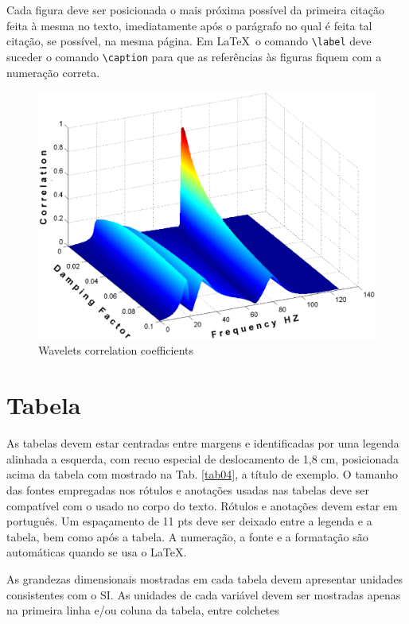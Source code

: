 Cada figura deve ser posicionada o mais próxima possível da primeira citação 
feita à mesma no texto, imediatamente após o parágrafo no qual é feita tal 
citação, se possível, na mesma página. Em \LaTeX\, o comando \texttt{\textbackslash label} deve suceder o comando \texttt{\textbackslash caption} para que as referências às figuras fiquem com a numeração correta.
\begin{figure}[h]
	\centering
	\includegraphics[keepaspectratio=true,scale=0.3]{figuras/fig01.eps}
	\caption{Wavelets correlation coefficients}
	\label{fig05}
\end{figure}

\section{Tabela}

As tabelas devem estar centradas entre margens e identificadas por uma legenda 
alinhada a esquerda, com recuo especial de deslocamento de 1,8 cm, posicionada 
acima da tabela com mostrado na Tab. \ref{tab04}, a título de 
exemplo. O tamanho das fontes empregadas nos rótulos e anotações usadas nas 
tabelas deve ser compatível com o usado no corpo do texto. Rótulos e anotações 
devem estar em português. Um espaçamento de 11 pts deve ser deixado entre a 
legenda e a tabela, bem como após a tabela. A numeração, a fonte e a formatação
são automáticas quando se usa o \LaTeX.

As grandezas dimensionais mostradas em cada tabela devem apresentar unidades 
consistentes com o SI. As unidades de cada variável devem ser mostradas apenas 
na primeira linha e/ou coluna da tabela, entre colchetes 


